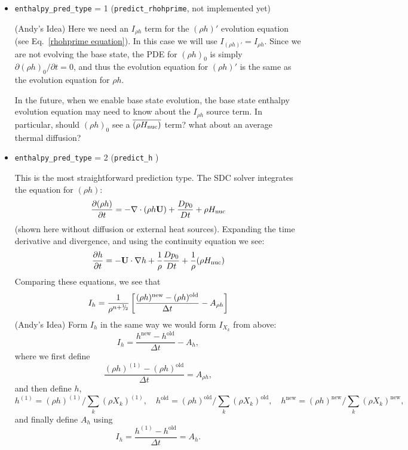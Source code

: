 \begin{itemize}
\item {\tt enthalpy\_pred\_type} = 1 ({\tt predict\_rhohprime}, not implemented yet)

(Andy's Idea) Here we need an $I_{\rho h}$ term for the $(\rho h)'$ evolution
equation (see Eq.~\ref{rhohprime equation}).  In this case we will use
$I_{(\rho h)'} = I_{\rho h}$.  Since we are not evolving the base state, the PDE
for $(\rho h)_0$ is simply $\partial(\rho h)_0/\partial t = 0$, and thus the
evolution equation for $(\rho h)'$ is the same as the evolution equation
for $\rho h$.

In the future, when we enable base state evolution, the base state enthalpy
evolution equation may need to know about the $I_{\rho h}$ source term.
In particular, should $(\rho h)_0$ see a $\overline{(\rho {H_{\rm nuc}})}$ term?
what about an average thermal diffusion?

\item {\tt enthalpy\_pred\_type} = 2 ({\tt predict\_h} )

This is the most straightforward prediction type.  The SDC solver
integrates the equation for $(\rho h)$:
\begin{equation}
\frac{\partial(\rho h)}{\partial t} = -\nabla\cdot(\rho h {\bf U}) + \frac{Dp_0}{Dt}  + \rho H_{\rm nuc} 
\end{equation}
(shown here without diffusion or external heat sources).  Expanding
the time derivative and divergence, and using the continuity equation
we see:
\begin{equation}
\frac{\partial h}{\partial t} = -{\bf U} \cdot \nabla h + \frac{1}{\rho} \frac{Dp_0}{Dt}  + \frac{1}{\rho} (\rho H_{\rm nuc}) \label{eq:sdc:h}
\end{equation}
Comparing these equations, we see that 
\begin{equation}
I_{h}  = \frac{1}{\rho^{n+\myhalf}} \left [
    \frac{(\rho h)^\mathrm{new} - (\rho h)^\mathrm{old}}{\Delta t} - A_{\rho h} \right ]
\end{equation}
(Andy's Idea) Form $I_h$ in the same way we would form $I_{X_k}$ from above:
\begin{equation}
I_h = \frac{h^\mathrm{new} - h^\mathrm{old}}{\Delta t} - A_h,
\end{equation}
where we first define
\begin{equation}
\frac{(\rho h)^{(1)} - (\rho h)^\mathrm{old}}{\Delta t} = A_{\rho h},
\end{equation}
and then define $h$,
\begin{equation}
h^{(1)} = (\rho h)^{(1)} / \sum_k(\rho X_k)^{(1)}, \quad h^\mathrm{old} = (\rho h)^\mathrm{old} / \sum_k(\rho X_k)^\mathrm{old}, \quad h^\mathrm{new} = (\rho h)^\mathrm{new} / \sum_k(\rho X_k)^\mathrm{new},
\end{equation}
and finally define $A_h$ using
\begin{equation}
I_h = \frac{h^{(1)} - h^\mathrm{old}}{\Delta t} = A_h.
\end{equation}


\end{itemize}
